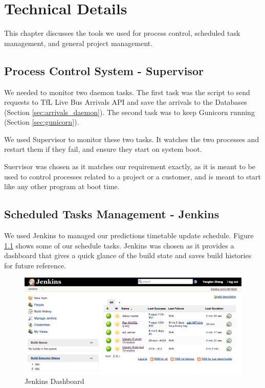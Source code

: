 \chapter{Technical Details}
\par This chapter discusses the tools we used for process control, scheduled task management, and general project management.

\section{Process Control System - Supervisor}
\par We needed to monitor two daemon tasks. The first task was the script to send requests to TfL Live Bus Arrivals API and save the arrivals to the Databases (Section \ref{sec:arrivals_daemon}). The second task was to keep Gunicorn running (Section \ref{sec:gunicorn}).

\par We used Supervisor\cite{supervisor} to monitor these two tasks. It watches the two processes and restart them if they fail, and ensure they start on system boot.

\par Suervisor was chosen as it matches our requirement exactly, as it is meant to be used to control processes related to a project or a customer, and is meant to start like any other program at boot time.

\section{Scheduled Tasks Management - Jenkins}
\par We used Jenkins\cite{jenkins} to managed our predictions timetable update schedule. Figure \ref{fig:jenkins} shows some of our schedule tasks. Jenkins was chosen as it provides a dashboard that gives a quick glance of the build state and saves build histories for future reference.

\begin{figure}
\centering
\includegraphics[width=\textwidth]{figures/jenkins.png}
\caption{\label{fig:jenkins} Jenkins Dashboard}
\end{figure}

